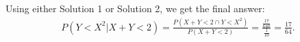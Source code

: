 \begin{exercise}
\begin{solution}
            Using either Solution 1 or Solution 2, we get the final answer:
            \begin{align*}
                P(Y<X^2|X+Y<2) = \frac{P(X+Y<2\cap Y < X^2)}{P(X+Y<2)} = \frac{\frac{17}{640}}{\frac{1}{10}} = \frac{17}{64}.
            \end{align*}
\end{solution}
\end{exercise}




